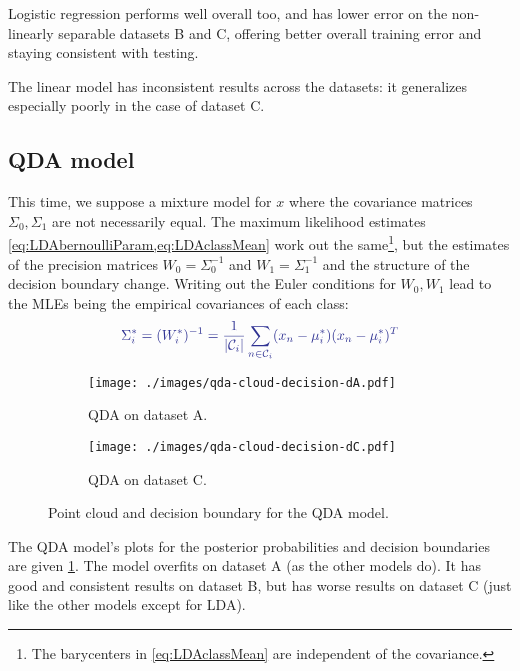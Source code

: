 \documentclass[11pt]{article}
\newcommand{\calC}{\mathcal{C}}
\begin{document}
Logistic regression performs well overall too, and has lower error on the non-linearly separable datasets B and C, offering better overall training error and staying consistent with testing.

The linear model has inconsistent results across the datasets: it generalizes especially poorly in the case of dataset C.


\subsection{QDA model}

This time, we suppose a mixture model for $x$ where the covariance matrices $\Sigma_0, \Sigma_1$ are not necessarily equal. The maximum likelihood estimates \cref{eq:LDAbernoulliParam,eq:LDAclassMean} work out the same\footnote{The barycenters in \cref{eq:LDAclassMean} are independent of the covariance.}, but the estimates of the precision matrices $W_0 = \Sigma_0^{-1}$ and $W_1 = \Sigma_1^{-1}$ and the structure of the decision boundary change. Writing out the Euler conditions for $W_0, W_1$ lead to the MLEs being the empirical covariances of each class:
\begin{equation}\label{eq:QDAcovar}
{\color{Blue}
	\Sigma^*_i = (W^*_i)^{-1} = \frac{1}{|\calC_i|}\sum_{n\in\calC_i} (x_n - \mu_i^*)(x_n - \mu_i^*)^T
}
\end{equation}

\begin{figure}
	\begin{subfigure}{.49\linewidth}
	\centering
	\texttt{[image: ./images/qda-cloud-decision-dA.pdf]}
	\caption{QDA on dataset A.}	
	\end{subfigure}
	\begin{subfigure}{.49\linewidth}
		\centering
		\texttt{[image: ./images/qda-cloud-decision-dC.pdf]}
		\caption{QDA on dataset C.}
	\end{subfigure}
	\caption{Point cloud and decision boundary for the QDA model.}\label{fig:QDA}
\end{figure}

The QDA model's plots for the posterior probabilities and decision boundaries are given \cref{fig:QDA}. The model overfits on dataset A (as the other models do). It has good and consistent results on dataset B, but has worse results on dataset C (just like the other models except for LDA).
\end{document}
